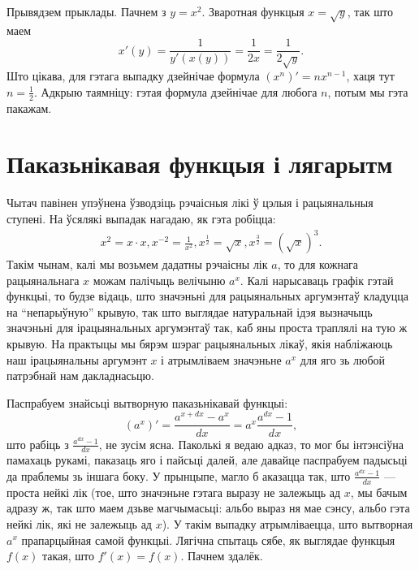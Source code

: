 \documentclass[10pt,a4paper]{book}
\theoremstyle{plain}
\begin{document}
Прывядзем прыклады. Пачнем з $y = x^2$. Зваротная функцыя $x = \sqrt{y}$, так
што маем
\begin{equation*}
  x'(y) = \frac{1}{y'(x(y))} = \frac{1}{2x} = \frac{1}{2\sqrt{y}}.
\end{equation*}
Што цікава, для гэтага выпадку дзейнічае формула $(x^n)' = nx^{n-1}$, хаця тут
$n = \frac{1}{2}$. Адкрыю таямніцу: гэтая формула дзейнічае для любога $n$,
потым мы гэта пакажам.

\section{Паказьнікавая функцыя і лягарытм}

Чытач павінен упэўнена ўзводзіць рэчаісныя лікі ў цэлыя і рацыянальныя
ступені. На ўсялякі выпадак нагадаю, як гэта робіцца:
\begin{align*}
  x^2 = x \cdot x, x^{-2} = \frac{1}{x^2}, x^{\frac{1}{2}} = \sqrt{x}, x^{\frac{3}{2}}
  = (\sqrt{x})^3.
\end{align*}
Такім чынам, калі мы возьмем дадатны рэчаісны лік $a$, то для кожнага
рацыянальнага $x$ можам палічыць велічыню $a^x$. Калі нарысаваць графік гэтай
функцыі, то будзе відаць, што значэньні для рацыянальных аргумэнтаў кладуцца на
``непарыўную'' крывую, так што выглядае натуральнай ідэя вызначыць значэньні для
ірацыянальных аргумэнтаў так, каб яны проста траплялі на тую ж крывую. На
практыцы мы бярэм шэраг рацыянальных лікаў, якія набліжаюць наш ірацыянальны
аргумэнт $x$ і атрымліваем значэньне $a^x$ для яго зь любой патрэбнай нам
дакладнасьцю.

Паспрабуем знайсьці вытворную паказьнікавай функцыі:
\begin{equation*}
  (a^x)' = \frac{a^{x+dx} - a^x}{dx} = a^x\frac{a^{dx} - 1}{dx},
\end{equation*}
што рабіць з $\frac{a^{dx} - 1}{dx}$, не зусім ясна. Паколькі я ведаю адказ, то
мог бы інтэнсіўна памахаць рукамі, паказаць яго і пайсьці далей, але давайце
паспрабуем падысьці да праблемы зь іншага боку. У прынцыпе, магло б аказацца
так, што $\frac{a^{dx} - 1}{dx}$ --- проста нейкі лік (тое, што значэньне гэтага
выразу не залежыць ад $x$, мы бачым адразу ж, так што маем дзьве магчымасьці:
альбо выраз ня мае сэнсу, альбо гэта нейкі лік, які не залежыць ад $x$). У такім
выпадку атрымліваецца, што вытворная $a^x$ прапарцыйная самой функцыі. Лягічна
спытаць сябе, як выглядае функцыя $f(x)$ такая, што $f'(x) = f(x)$. Пачнем
здалёк.
\end{document}
